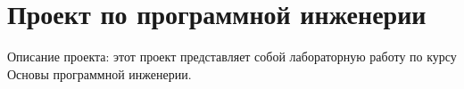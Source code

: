 \chapter{Проект по программной инженерии}
\hypertarget{md__r_e_a_d_m_e}{}\label{md__r_e_a_d_m_e}
\label{md__r_e_a_d_m_e_autotoc_md0}%
%


Описание проекта\+: этот проект представляет собой лабораторную работу по курсу \textquotesingle{}Основы программной инженерии\textquotesingle{}.  